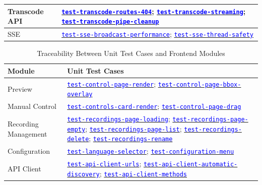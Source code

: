 \documentclass[12pt, titlepage]{article}
\newcommand{\tid}[1]{\hyperlink{tid:#1}{\textcolor{blue}{\texttt{#1}}}}
\begin{document}
\begin{longtable}{|p{4.5cm}|p{10cm}|}
  \hline
  Transcode API                   & \tid{test-transcode-routes-404}; \tid{test-transcode-streaming}; \tid{test-transcode-pipe-cleanup}                                                                                                                                                                                        \\
  \hline
  SSE                             & \tid{test-sse-broadcast-performance}; \tid{test-sse-thread-safety}                                                                                                                                                                                                                        \\
\end{longtable}
\normalsize

\begin{table}[H]
  \centering
  \caption{Traceability Between Unit Test Cases and Frontend Modules}
  \label{TblUTM3}
  \small
  \begin{tabularx}{\textwidth}{|p{4.5cm}|X|}
    \hline
    \textbf{Module}            & \textbf{Unit Test Cases}                                                                                                                                                                                    \\
    \hline
    Preview                    & \tid{test-control-page-render}; \tid{test-control-page-bbox-overlay}                                                                                                                                        \\
    \hline
    Manual Control             & \tid{test-controls-card-render}; \tid{test-control-page-drag}                                                                                                                                               \\
    \hline
    Recording Management       & \tid{test-recordings-page-loading}; \tid{test-recordings-page-empty}; \tid{test-recordings-page-list}; \tid{test-recordings-delete}; \tid{test-recordings-rename}                                           \\
    \hline
    Configuration              & \tid{test-language-selector}; \tid{test-configuration-menu}                                                                                                                                                 \\
    \hline
    API Client                 & \tid{test-api-client-urls}; \tid{test-api-client-automatic-discovery}; \tid{test-api-client-methods}                                                                                                        \\

\end{tabularx}
\end{table}
\end{document}
